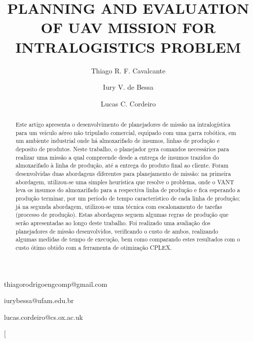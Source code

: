 \documentclass[conference,harvard,brazil,english]{sbatex}
\begin{document}

\title{PLANNING AND EVALUATION OF UAV MISSION FOR INTRALOGISTICS PROBLEM}

\author{Thiago R. F. Cavalcante}{thiagorodrigoengcomp@gmail.com}
\address{Graduate Program in Electrical Engineering, Federal University of Amazonas, Manaus, AM, Brazil}

\author{Iury V. de Bessa}{iurybessa@ufam.edu.br}
\address{Department of Electricity, Federal University of Amazonas, Manaus, AM, Brazil}

\author{Lucas C. Cordeiro}{lucas.cordeiro@cs.ox.ac.uk}
\address{Department of Computer Science, University of Oxford, Oxford, United Kingdom}



\twocolumn[

\maketitle

\begin{abstract}
Este artigo apresenta o desenvolvimento de planejadores de missão na intralogística para um veículo aéreo não tripulado comercial, equipado com uma garra robótica, em um ambiente industrial onde há almoxarifado de insumos, linhas de produção e deposito de produtos. Neste trabalho, o planejador gera comandos necessários para realizar uma missão a qual compreende desde a entrega de insumos trazidos do almoxarifado à linha de produção, até a entrega do produto final ao cliente. Foram desenvolvidas duas abordagens diferentes para planejamento de missão: na primeira abordagem, utilizou-se uma simples heurística que resolve o problema, onde o VANT leva os insumos do almoxarifado para a respectiva linha de produção e fica esperando a produção terminar, por um período de tempo característico de cada linha de produção; já na segunda abordagem, utilizou-se uma técnica com escalonamento de tarefas (processo de produção). Estas abordagens seguem algumas regras de produção que serão apresentadas ao longo deste trabalho. Foi realizado uma avaliação dos planejadores de missão desenvolvidos, verificando o custo de ambos, realizando algumas medidas de tempo de execução, bem como comparando estes resultados com o custo ótimo obtido  com a ferramenta de otimização CPLEX.   \end{abstract}

\end{document}
